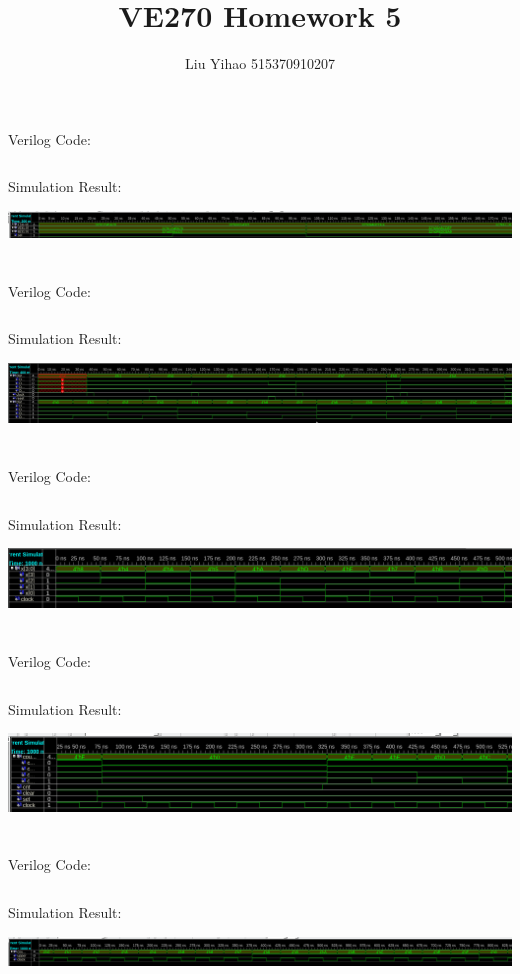 \documentclass{article}
\title{VE270 Homework 5}
\author{Liu Yihao 515370910207}
\date{}
\begin{document}
\maketitle

\section{}
\noindent Verilog Code:
\inputminted{verilog}{Q1.v}
\noindent Simulation Result:
\begin{center}
\includegraphics[width=0.95\linewidth]{Q1.png}
\end{center}

\newpage
\section{}
\noindent Verilog Code:
\inputminted{verilog}{Q2.v}
\noindent Simulation Result:
\begin{center}
\includegraphics[width=0.95\linewidth]{Q2.png}
\end{center}

\newpage
\section{}
\noindent Verilog Code:
\inputminted{verilog}{Q3.v}
\noindent Simulation Result:
\begin{center}
\includegraphics[width=0.95\linewidth]{Q3.png}
\end{center}

\newpage
\section{}
\noindent Verilog Code:
\inputminted{verilog}{Q4.v}
\noindent Simulation Result:
\begin{center}
\includegraphics[width=0.95\linewidth]{Q4.png}
\end{center}

\newpage
\section{}
\noindent Verilog Code:
\inputminted{verilog}{Q5.v}
\noindent Simulation Result:
\begin{center}
\includegraphics[width=0.95\linewidth]{Q5.png}
\end{center}
\end{document}
